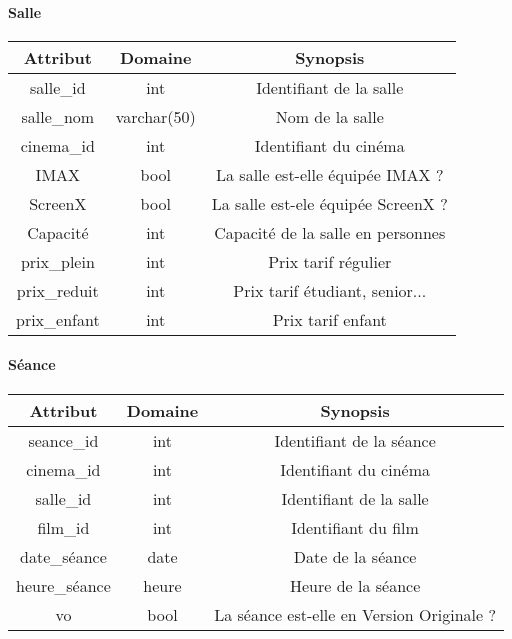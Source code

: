 \documentclass[12pt]{article}
\begin{document}
\paragraph*{Salle}
\begin{center}
    \begin{tabular}{||c c c||} 
     \hline
     Attribut & Domaine & Synopsis\\ [0.5ex] 
     \hline\hline
     {\color{blue} salle{\_}id} & int & Identifiant de la salle \\ 
     \hline
     salle{\_}nom & varchar(50) & Nom de la salle \\
     \hline
     cinema{\_}id & int & Identifiant du cinéma\\
     \hline
     IMAX & bool & La salle est-elle équipée IMAX ? \\
     \hline
     ScreenX & bool & La salle est-ele équipée ScreenX ? \\
     \hline
     Capacité & int & Capacité de la salle en personnes \\
     \hline
     prix{\_}plein & int & Prix tarif régulier \\
     \hline
     prix{\_}reduit & int & Prix tarif étudiant, senior... \\
     \hline
     prix{\_}enfant & int & Prix tarif enfant \\
     \hline
    \end{tabular}
\end{center}
\pagebreak
\paragraph*{Séance}
\begin{center}
    \begin{tabular}{||c c c||} 
     \hline
     Attribut & Domaine & Synopsis\\ [0.5ex] 
     \hline\hline
     {\color{blue} seance{\_}id} & int & Identifiant de la séance \\ 
     \hline
     cinema{\_}id & int & Identifiant du cinéma \\
     \hline
     salle{\_}id & int & Identifiant de la salle\\
     \hline
     film{\_}id & int & Identifiant du film \\
     \hline
     date{\_}séance & date & Date de la séance \\
     \hline
     heure{\_}séance & heure & Heure de la séance \\
     \hline
     vo & bool & La séance est-elle en Version Originale ? \\
     \hline
    \end{tabular}
\end{center}
\end{document}
